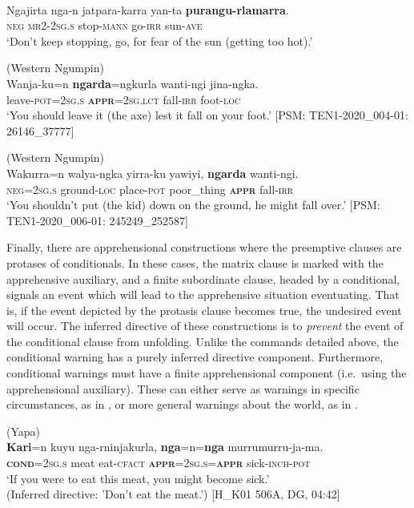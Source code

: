 \documentclass[output=paper,colorlinks,citecolor=brown]{langscibook}
\begin{document}
\ea
{} {\citealt{richards_interactive_2012}} \\
\gll Ngajirta nga-n jatpara-karra yan-ta \textbf{purangu-rlamarra}. \\
\textsc{neg} \textsc{mr2-2sg.s} stop-\textsc{mann} go-\textsc{irr} sun-\textsc{ave} \\
\glt `Don't keep stopping, go, for fear of the sun (getting too hot).'
\label{ex:bro74}
\z

\ea 
\textnormal{ (Western Ngumpin)} \\
\gll Wanja-ku=n \textbf{ngarda}=ngkurla wanti-ngi jina-ngka. \\
leave-\textsc{pot=2sg.s} \textsc{\textbf{appr}=2sg.lct} fall-\textsc{irr} foot-\textsc{loc} \\
\glt `You should leave it (the axe) lest it fall on your foot.' [PSM: TEN1-2020\_004-01: 26146\_37777]
\label{ex:bro75}
\z

\ea 
\textnormal{ (Western Ngumpin)} \\
\gll Wakurra=n walya-ngka yirra-ku yawiyi, \textbf{ngarda} wanti-ngi. \\
\textsc{neg=2sg.s} ground-\textsc{loc} place-\textsc{pot} poor\_thing \textbf{\textsc{appr}} fall-\textsc{irr} \\
\glt `You shouldn't put (the kid) down on the ground, he might fall over.' [PSM: TEN1-2020\_006-01: 245249\_252587]
\label{ex:bro76}
\z

 Finally, there are apprehensional constructions where the preemptive clauses are protases of conditionals. In these cases, the matrix clause is marked with the apprehensive auxiliary, and a finite subordinate clause, headed by a conditional, signals an event which will lead to the apprehensive situation eventuating. That is, if the event depicted by the protasis clause becomes true, the undesired event will occur. The inferred directive of these constructions is to \textit{prevent} the event of the conditional clause from unfolding. Unlike the commands detailed above, the conditional warning has a purely inferred directive component. Furthermore, conditional warnings must have a finite apprehensional component (i.e.\  using the apprehensional auxiliary). These can either serve as warnings in specific circumstances, as in , or more general warnings about the world, as in .

\ea 
\textnormal{ (Yapa)} \\
\gll \textbf{Kari}=n kuyu nga-rninjakurla, \textbf{nga}=n=\textbf{nga} murrumurru-ja-ma. \\
\textbf{\textsc{cond}}=\textsc{2sg.s} meat eat-\textsc{cfact} \textbf{\textsc{appr}}=\textsc{2sg.s=\textbf{appr}} sick-\textsc{inch-pot} \\
\glt `If you were to eat this meat, you might become sick.' \\
(Inferred directive: 'Don't eat the meat.') [H\_K01 506A, DG, 04:42]
\label{ex:bro77}
\z
\end{document}
